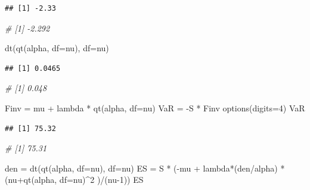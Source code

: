 \documentclass[
  oneside]{book}
\newenvironment{Shaded}{\begin{snugshade}}{\end{snugshade}}
\newcommand{\AttributeTok}[1]{\textcolor[rgb]{0.77,0.63,0.00}{#1}}
\newcommand{\CommentTok}[1]{\textcolor[rgb]{0.56,0.35,0.01}{\textit{#1}}}
\newcommand{\DecValTok}[1]{\textcolor[rgb]{0.00,0.00,0.81}{#1}}
\newcommand{\FunctionTok}[1]{\textcolor[rgb]{0.00,0.00,0.00}{#1}}
\newcommand{\NormalTok}[1]{#1}
\newcommand{\OtherTok}[1]{\textcolor[rgb]{0.56,0.35,0.01}{#1}}
\newcommand{\SpecialCharTok}[1]{\textcolor[rgb]{0.00,0.00,0.00}{#1}}
\begin{document}
\begin{verbatim}
## [1] -2.33
\end{verbatim}

\begin{Shaded}
\begin{Highlighting}[]
\CommentTok{\# [1] {-}2.292}
\end{Highlighting}
\end{Shaded}

\begin{Shaded}
\begin{Highlighting}[]
\FunctionTok{dt}\NormalTok{(}\FunctionTok{qt}\NormalTok{(alpha, }\AttributeTok{df=}\NormalTok{nu), }\AttributeTok{df=}\NormalTok{nu)}
\end{Highlighting}
\end{Shaded}

\begin{verbatim}
## [1] 0.0465
\end{verbatim}

\begin{Shaded}
\begin{Highlighting}[]
\CommentTok{\# [1] 0.048}
\end{Highlighting}
\end{Shaded}

\begin{Shaded}
\begin{Highlighting}[]
\NormalTok{Finv }\OtherTok{=}\NormalTok{ mu }\SpecialCharTok{+}\NormalTok{ lambda }\SpecialCharTok{*} \FunctionTok{qt}\NormalTok{(alpha, }\AttributeTok{df=}\NormalTok{nu)}
\NormalTok{VaR }\OtherTok{=} \SpecialCharTok{{-}}\NormalTok{S }\SpecialCharTok{*}\NormalTok{ Finv}
\FunctionTok{options}\NormalTok{(}\AttributeTok{digits=}\DecValTok{4}\NormalTok{)}
\NormalTok{VaR}
\end{Highlighting}
\end{Shaded}

\begin{verbatim}
## [1] 75.32
\end{verbatim}

\begin{Shaded}
\begin{Highlighting}[]
\CommentTok{\# [1] 75.31}
\end{Highlighting}
\end{Shaded}

\begin{Shaded}
\begin{Highlighting}[]
\NormalTok{den }\OtherTok{=} \FunctionTok{dt}\NormalTok{(}\FunctionTok{qt}\NormalTok{(alpha, }\AttributeTok{df=}\NormalTok{nu), }\AttributeTok{df=}\NormalTok{nu)}
\NormalTok{ES }\OtherTok{=}\NormalTok{ S }\SpecialCharTok{*}\NormalTok{ (}\SpecialCharTok{{-}}\NormalTok{mu }\SpecialCharTok{+}\NormalTok{ lambda}\SpecialCharTok{*}\NormalTok{(den}\SpecialCharTok{/}\NormalTok{alpha) }\SpecialCharTok{*}\NormalTok{ (nu}\SpecialCharTok{+}\FunctionTok{qt}\NormalTok{(alpha, }\AttributeTok{df=}\NormalTok{nu)}\SpecialCharTok{\^{}}\DecValTok{2}\NormalTok{ )}\SpecialCharTok{/}\NormalTok{(nu}\DecValTok{{-}1}\NormalTok{))}
\NormalTok{ES}
\end{Highlighting}
\end{Shaded}
\end{document}
